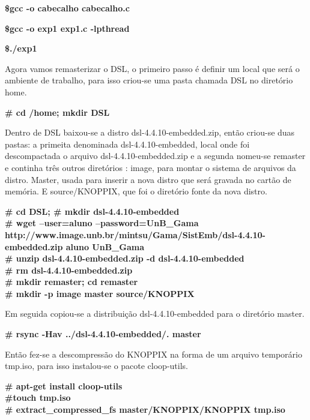 \documentclass{ieee}
\begin{document}
\begin{flushleft}
\textbf{\$gcc -o cabecalho cabecalho.c}

\textbf{\$gcc -o exp1 exp1.c -lpthread}

\textbf{\$./exp1} 
 
\end{flushleft}



Agora vamos remasterizar o DSL, o primeiro passo é definir um local que será o ambiente de trabalho,
para isso criou-se uma pasta chamada DSL no diretório home.

\begin{flushleft}
\textbf{\# cd /home; mkdir DSL}  
\end{flushleft}




Dentro de DSL baixou-se a distro dsl-4.4.10-embedded.zip, então criou-se duas pastas: a primeita denominada dsl-4.4.10-embedded, 
local onde foi descompactada o arquivo dsl-4.4.10-embedded.zip e a segunda nomeu-se remaster e continha três outros diretórios : 
image, para montar o sistema de arquivos da distro. Master, usada para inserir a nova distro que será gravada no cartão de memória.
E source/KNOPPIX, que foi o diretório fonte da nova distro.

\begin{flushleft}

\textbf{\# cd DSL;
\# mkdir dsl-4.4.10-embedded
\\
\# wget --user=aluno --password=UnB\_Gama http://www.image.unb.br/mintsu/Gama/SistEmb/dsl-4.4.10-embedded.zip aluno UnB\_Gama 
\\
\# unzip dsl-4.4.10-embedded.zip -d dsl-4.4.10-embedded
\\
\# rm dsl-4.4.10-embedded.zip
\\
\# mkdir remaster; cd remaster
\\
\# mkdir -p image master source/KNOPPIX
} 
\end{flushleft}

Em seguida copiou-se  a distribuição dsl-4.4.10-embedded para o diretório master.

\begin{flushleft}
 \textbf{\# rsync -Hav ../dsl-4.4.10-embedded/. master}
\end{flushleft}

Então fez-se a descompressão do KNOPPIX na forma de um arquivo temporário tmp.iso, para isso instalou-se o pacote cloop-utils. 
\begin{flushleft}
 \textbf{\# apt-get install cloop-utils\\
 \#touch tmp.iso\\
 \# extract\_compressed\_fs master/KNOPPIX/KNOPPIX tmp.iso \\
 }
\end{flushleft}
\end{document}
